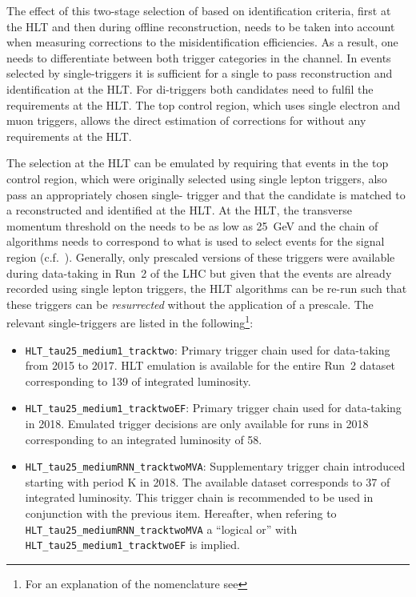 The effect of this two-stage selection of \tauhadvis based on
identification criteria, first at the HLT and then during offline
reconstruction, needs to be taken into account when measuring
corrections to the \tauhadvis misidentification efficiencies. As a
result, one needs to differentiate between both trigger categories in
the \hadhad channel. In events selected by single-\tauhadvis triggers
it is sufficient for a single \tauhadvis to pass reconstruction and
identification at the HLT. For di-\tauhadvis triggers both candidates
need to fulfil the requirements at the HLT.  The top control region,
which uses single electron and muon triggers, allows the direct
estimation of corrections for \tauhadvis without any requirements at
the HLT.

The selection at the HLT can be emulated by requiring that events in
the top control region, which were originally selected using single
lepton triggers, also pass an appropriately chosen single-\tauhadvis
trigger and that the \tauhadvis candidate is matched to a
reconstructed and identified \tauhadvis at the HLT. At the HLT, the
transverse momentum threshold on the \tauhadvis needs to be as low as
\SI{25}{\GeV} and the chain of algorithms needs to correspond to what
is used to select events for the \hadhad signal region (c.f.\
).  Generally, only prescaled versions of these
triggers were available during data-taking in Run~2 of the LHC but
given that the events are already recorded using single lepton
triggers, the HLT algorithms can be re-run such that these triggers
can be \textit{resurrected} without the application of a prescale. The
relevant single-\tauhadvis triggers are listed in the
following\footnote{For an explanation of the nomenclature see
  }:
\begin{itemize}

\item \verb|HLT_tau25_medium1_tracktwo|: Primary trigger chain used
  for data-taking from 2015 to 2017. HLT emulation is available for
  the entire Run~2 dataset corresponding to \SI{139}{\ifb} of
  integrated luminosity.

\item \verb|HLT_tau25_medium1_tracktwoEF|: Primary trigger chain used
  for data-taking in 2018. Emulated trigger decisions are only
  available for runs in 2018 corresponding to an integrated luminosity
  of \SI{58}{\ifb}.

\item \verb|HLT_tau25_mediumRNN_tracktwoMVA|: Supplementary trigger
  chain introduced starting with period K in 2018. The available
  dataset corresponds to \SI{37}{\ifb} of integrated luminosity.  This
  trigger chain is recommended to be used in conjunction with the
  previous item. Hereafter, when refering to
  \verb|HLT_tau25_mediumRNN_tracktwoMVA| a ``logical or'' with
  \verb|HLT_tau25_medium1_tracktwoEF| is implied.

\end{itemize}

